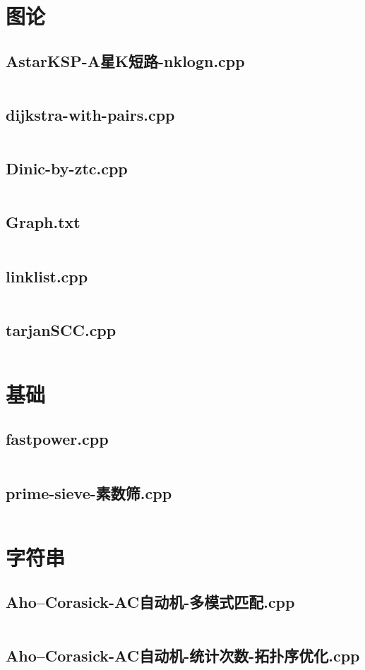 \documentclass[a4paper,landscape,twocolumn]{book} %
\begin{document}
\chapter{图论}
\section{AstarKSP-A星K短路-nklogn.cpp}
\inputminted{c++}{./codes/009}
\section{dijkstra-with-pairs.cpp}
\inputminted{c++}{./codes/010}
\section{Dinic-by-ztc.cpp}
\inputminted{c++}{./codes/011}
\section{Graph.txt}
\inputminted{text}{./codes/012}
\section{linklist.cpp}
\inputminted{c++}{./codes/013}
\section{tarjanSCC.cpp}
\inputminted{c++}{./codes/014}
\chapter{基础}
\section{fastpower.cpp}
\inputminted{c++}{./codes/015}
\section{prime-sieve-素数筛.cpp}
\inputminted{c++}{./codes/016}
\chapter{字符串}
\section{Aho–Corasick-AC自动机-多模式匹配.cpp}
\inputminted{c++}{./codes/017}
\section{Aho–Corasick-AC自动机-统计次数-拓扑序优化.cpp}
\inputminted{c++}{./codes/018}
\end{document}
